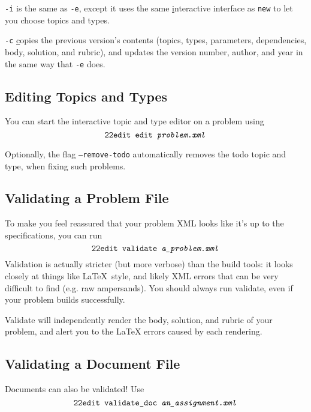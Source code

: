     \texttt{-i} is the same as \texttt{-e}, except it uses the same 
    \underline{i}nteractive interface as \pytool\texttt{new} to let you 
    choose topics and types.
    
    \texttt{-c} \underline{c}opies the previous version's contents 
    (topics, types, parameters, dependencies, body, solution, and rubric),
    and updates the version number, author, and year in the same way that 
    \texttt{-e} does.
    
  \subsection{Editing Topics and Types}
    You can start the interactive topic and type editor on a problem using 
    \[\texttt{22edit }\texttt{edit \textit{problem.xml}}\]
    
    Optionally, the flag \texttt{--remove-todo} automatically removes the 
    todo topic and type, when fixing such problems.
    
  \subsection{Validating a Problem File}
    To make you feel reassured that your problem XML looks like it's up to 
    the specifications, you can run 
    \[\texttt{22edit }\texttt{validate \textit{a\_problem.xml}}\] 
    Validation is actually stricter (but more verbose) than the build 
    tools: it looks closely at things like \LaTeX\ style, and likely XML 
    errors that can be very difficult to find (e.g. raw ampersands). 
    You should always run validate, even if your problem builds successfully.
    
    Validate will independently render the body, solution, and rubric of your
    problem, and alert you to the LaTeX errors caused by each rendering.
    
  \subsection{Validating a Document File}
    Documents can also be validated! Use
    \[\texttt{22edit }\texttt{validate\_doc \textit{an\_assignment.xml}}\]